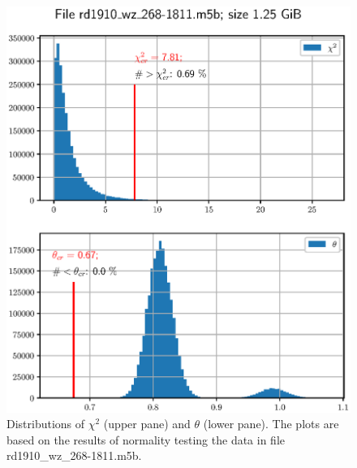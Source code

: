 \documentclass[letterpaper,twoside,12pt]{article}
\begin{document}
\begin{figure}[ht!]
  \begin{center}
  \includegraphics[width=35pc]{fig_chi2_and_thresh_distr_2.eps}
  \caption{\small Distributions of $\chi^2$ (upper pane) and $\theta$ (lower pane). The plots are based on the results of normality testing the data in file rd1910\_wz\_268-1811.m5b.}
  \label{chi2_and_thresh_distr_2}
  \end{center}
\end{figure}
\end{document}
